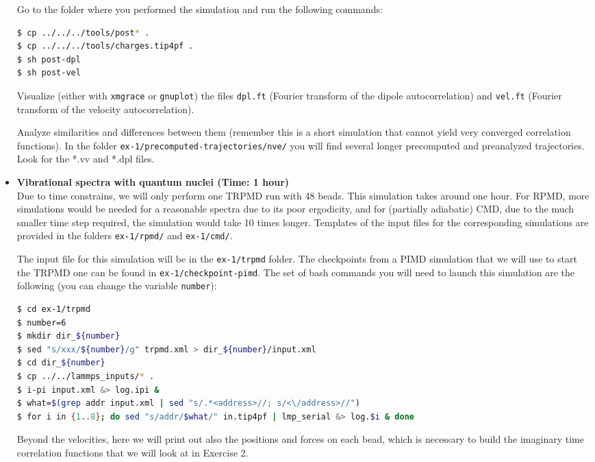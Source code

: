 \documentclass{article}
\begin{document}
\begin{Exercise}[label={realtime},title={Velocity and dipole real time correlation functions}]
\begin{itemize}
Go to the folder where you performed the simulation and run the following commands:

\begin{lstlisting}[language=Bash,emph={\$}]
$ cp ../../../tools/post* .
$ cp ../../../tools/charges.tip4pf .
$ sh post-dpl
$ sh post-vel
\end{lstlisting}

Visualize (either with \texttt{xmgrace} or \texttt{gnuplot}) the files \texttt{dpl.ft} (Fourier transform of the dipole autocorrelation) and \texttt{vel.ft} (Fourier transform of the velocity autocorrelation). 

Analyze similarities and differences between them (remember this is a short simulation that cannot yield very converged correlation functions). In the folder \texttt{ex-1/precomputed-trajectories/nve/} you will find several longer precomputed and preanalyzed trajectories. Look for the *.vv and *.dpl files.


\item {\bf Vibrational spectra with quantum nuclei (Time: 1 hour)} \\
Due to time constrains, we will only perform one TRPMD run with 48 beads.
This simulation takes around one hour. For RPMD, more simulations would be needed for a reasonable spectra due to its poor ergodicity, and for (partially adiabatic) CMD, due to the much smaller time step required, the simulation would take 10 times longer. Templates of the input files for the corresponding simulations are provided in the folders \texttt{ex-1/rpmd/} and \texttt{ex-1/cmd/}.

The input file for this simulation will be in the \texttt{ex-1/trpmd} folder. The checkpoints from a PIMD simulation that we will use to start the TRPMD one can be found in \texttt{ex-1/checkpoint-pimd}. The set of bash commands you will need to launch this simulation are the following (you can change the variable \texttt{number}):

\begin{lstlisting}[language=Bash,emph={\$}]
$ cd ex-1/trpmd
$ number=6
$ mkdir dir_${number} 
$ sed "s/xxx/${number}/g" trpmd.xml > dir_${number}/input.xml
$ cd dir_${number}
$ cp ../../lammps_inputs/* .
$ i-pi input.xml &> log.ipi &
$ what=$(grep addr input.xml | sed "s/.*<address>//; s/<\/address>//")
$ for i in {1..8}; do sed "s/addr/$what/" in.tip4pf | lmp_serial &> log.$i & done
\end{lstlisting}


Beyond the velocities, here we will print out also the positions and forces on each bead, which is necessary to build the imaginary time correlation functions that we will look at in Exercise 2.


\end{itemize}
\end{Exercise}
\end{document}

